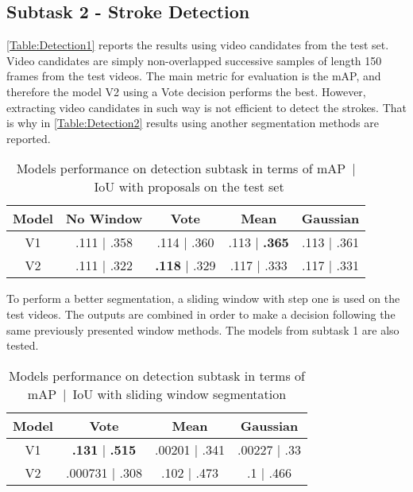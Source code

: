\documentclass[
]{ceurart}
\begin{document}
\subsection{Subtask 2 - Stroke Detection}





\autoref{Table:Detection1} reports the results using video candidates from the test set. Video candidates are simply non-overlapped successive samples of length 150 frames from the test videos. The main metric for evaluation is the mAP, and therefore the model V2 using a Vote decision performs the best. However, extracting video candidates in such way is not efficient to detect the strokes. That is why in \autoref{Table:Detection2} results using another segmentation methods are reported.

\begin{table}
    \centering
    \caption{Models performance on detection subtask in terms of mAP~|~IoU with proposals on the test set}
    \label{Table:Detection1}
    \begin{tabular}{|c|c|c|c|c|}
        \toprule
        Model & No Window & Vote & Mean & Gaussian \\ \midrule
        V1 & .111 | .358  & .114 | .360 & .113 | \textbf{.365} & .113 | .361 \\ \midrule
        V2 & .111 | .322 & \textbf{.118} | .329 & .117 | .333 & .117 | .331 \\ \bottomrule
    \end{tabular}
\end{table}

To perform a better segmentation, a sliding window with step one is used on the test videos. The outputs are combined in order to make a decision following the same previously presented window methods. The models from subtask 1 are also tested. 

\begin{table}
    \centering
    \caption{Models performance on detection subtask in terms of mAP~|~IoU with sliding window segmentation}
    \label{Table:Detection2}
    \begin{tabular}{|c|c|c|c|}
    \toprule
        Model & Vote & Mean & Gaussian \\ \midrule
        V1 & \textbf{.131} | \textbf{.515} & .00201 | .341 & .00227 | .33 \\ \midrule
V2 & .000731 | .308 & .102 | .473 & .1 | .466 \\
\bottomrule
    \end{tabular}
\end{table}
\end{document}
